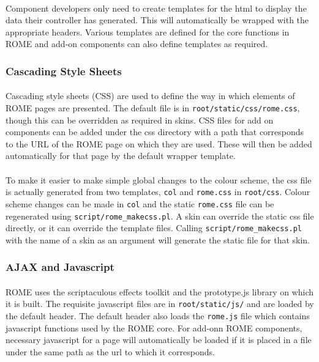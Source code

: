 \paragraph{} 
Component developers only need to create templates for the html to display the data their controller has generated. This will automatically be wrapped with the appropriate headers. Various templates are defined for the core functions in ROME and add-on components can also define templates as required. 

\subsubsection{Cascading Style Sheets}
\label{sec:view_css}

\paragraph{}
Cascading style sheets (CSS) are used to define the way in which elements of ROME pages are presented. The default file is in \texttt{root/static/css/rome.css}, though this can be overridden as required in skins. CSS files for add on components can be added under the css directory with a path that corresponds to the URL of the ROME page on which they are used. These will then be added automatically for that page by the default wrapper template.

\paragraph{}
To make it easier to make simple global changes to the colour scheme, the css file is actually generated from two templates, \texttt{col} and \texttt{rome.css} in \texttt{root/css}. Colour scheme changes can be made in \texttt{col} and the static \texttt{rome.css} file can be regenerated using \texttt{script/rome\_makecss.pl}. A skin can override the static css file directly, or it can override the template files. Calling \texttt{script/rome\_makecss.pl} with the name of a skin as an argument will generate the static file for that skin.


\subsubsection{AJAX and Javascript}
\label{sec:view_javascript}

\paragraph{}
ROME uses the scriptaculous effects toolkit and the prototype.js library on which it is built. The requisite javascript files are in \texttt{root/static/js/} and are loaded by the default header. The default header also loads the \texttt{rome.js} file which contains javascript functions used by the ROME core. For add-onn ROME components, necessary javascript for a page will automatically be loaded if it is placed in a file under the same path as the url to which it corresponds. 

